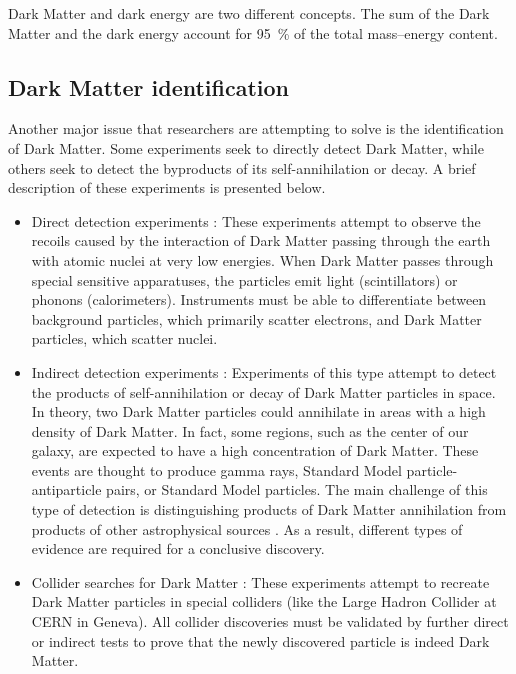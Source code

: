 Dark Matter and dark energy are two different concepts. The sum of the Dark Matter and the dark energy account for \SI{95}{\percent} of the total mass–energy content.


\subsection*{Dark Matter identification}
Another major issue that researchers are attempting to solve is the identification of Dark Matter. Some experiments seek to directly detect Dark Matter, while others seek to detect the byproducts of its self-annihilation or decay. A brief description of these experiments is presented below.

\begin{itemize}
    \itemsep0em
    \item Direct detection experiments \cite{feng_2010_dark}: These experiments attempt to observe the recoils caused by the interaction of Dark Matter passing through the earth with atomic nuclei at very low energies. When Dark Matter passes through special sensitive apparatuses, the particles emit light (scintillators) or phonons (calorimeters). Instruments must be able to differentiate between background particles, which primarily scatter electrons, and Dark Matter particles, which scatter nuclei.
    \item Indirect detection experiments \cite{feng_2010_dark}: Experiments of this type attempt to detect the products of self-annihilation or decay of Dark Matter particles in space. In theory, two Dark Matter particles could annihilate in areas with a high density of Dark Matter. In fact, some regions, such as the center of our galaxy, are expected to have a high concentration of Dark Matter. These events are thought to produce gamma rays, Standard Model particle-antiparticle pairs, or Standard Model particles. The main challenge of this type of detection is distinguishing products of Dark Matter annihilation from products of other astrophysical sources \cite{doetinchem_2020_cosmicray}. As a result, different types of evidence are required for a conclusive discovery.
    \item Collider searches for Dark Matter \cite{feng_2010_dark}: These experiments attempt to recreate Dark Matter particles in special colliders (like the Large Hadron Collider at CERN in Geneva). All collider discoveries must be validated by further direct or indirect tests to prove that the newly discovered particle is indeed Dark Matter.
\end{itemize}


